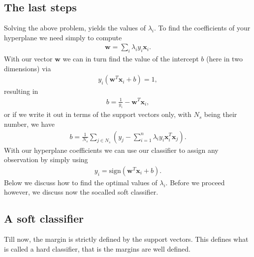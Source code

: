 \documentclass[letterpaper,10pt,english]{sphinxmanual}
\begin{document}
\subsection{The last steps}
\label{\detokenize{chapter7:the-last-steps}}
Solving the above problem, yields the values of \(\lambda_i\).
To find the coefficients of your hyperplane we need simply to compute
\begin{equation*}
\begin{split}
\boldsymbol{w}=\sum_{i} \lambda_iy_i\boldsymbol{x}_i.
\end{split}
\end{equation*}
With our vector \(\boldsymbol{w}\) we can in turn find the value of the intercept \(b\) (here in two dimensions) via
\begin{equation*}
\begin{split}
y_i(\boldsymbol{w}^T\boldsymbol{x}_i+b)=1,
\end{split}
\end{equation*}
resulting in
\begin{equation*}
\begin{split}
b = \frac{1}{y_i}-\boldsymbol{w}^T\boldsymbol{x}_i,
\end{split}
\end{equation*}
or if we write it out in terms of the support vectors only, with \(N_s\) being their number,  we have
\begin{equation*}
\begin{split}
b = \frac{1}{N_s}\sum_{j\in N_s}\left(y_j-\sum_{i=1}^n\lambda_iy_i\boldsymbol{x}_i^T\boldsymbol{x}_j\right).
\end{split}
\end{equation*}
With our hyperplane coefficients we can use our classifier to assign any observation by simply using
\begin{equation*}
\begin{split}
y_i = \mathrm{sign}(\boldsymbol{w}^T\boldsymbol{x}_i+b).
\end{split}
\end{equation*}
Below we discuss how to find the optimal values of \(\lambda_i\). Before we proceed however, we discuss now the so\sphinxhyphen{}called soft classifier.


\subsection{A soft classifier}
\label{\detokenize{chapter7:a-soft-classifier}}
Till now, the margin is strictly defined by the support vectors. This defines what is called a hard classifier, that is the margins are well defined.
\end{document}
